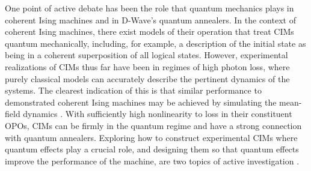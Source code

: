 \documentclass[fleqn,10pt]{wlscirep}
\begin{document}
One point of active debate has been the role that quantum mechanics plays in coherent Ising machines and in D-Wave's quantum annealers. In the context of coherent Ising machines, there exist models of their operation that treat CIMs quantum mechanically\cite{wang2013coherent,yamamoto2017coherent}, including, for example, a description of the initial state as being in a coherent superposition of all logical states\cite{yamamoto2017coherent}. However, experimental realizations of CIMs thus far\cite{marandi2014network,inagaki2016large,mcmahon2016fully,inagaki2016coherent,honjo2021spin} have been in regimes of high photon loss, where purely classical models can accurately describe the pertinent dynamics of the systems. The clearest indication of this is that similar performance to demonstrated coherent Ising machines  may be achieved by simulating the mean-field dynamics \cite{bilbro1989optimization,king2018emulating,tiunov2019annealing,hamerly2019experimental}. With sufficiently high nonlinearity to loss in their constituent OPOs, CIMs can be firmly in the quantum regime\cite{onodera2018nonlinear} and have a strong connection with quantum annealers\cite{goto2016bifurcation}. Exploring how to construct experimental CIMs where quantum effects play a crucial role, and designing them so that quantum effects improve the performance of the machine, are two topics of active investigation \cite{yamamoto2020coherent}.  
\end{document}
